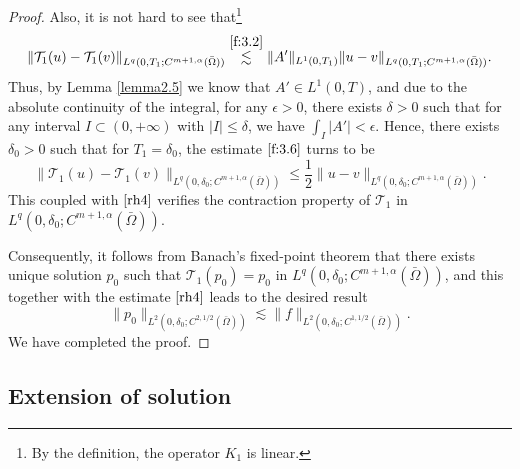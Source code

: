 \documentclass[13pt,CJK]{article}
\theoremstyle{plain}                       %
\theoremstyle{remark}
\numberwithin{equation}{section}
\begin{document}
\begin{proof}
Also, it is not hard to see that\footnote{By the definition,
the operator
$K_1$ is linear.}
\begin{equation}\label{f:3.6}
 \|\mathcal{T}_1(u)-\mathcal{T}_1(v)
 \|_{L^q(0,T_1;C^{m+1,\alpha}(\bar\Omega))}
 \overset{\eqref{f:3.2}}{\lesssim} \|A'\|_{L^1(0,T_1)}
\|u-v\|_{L^q(0,T_1;C^{m+1,\alpha}(\bar\Omega))}.
\end{equation}
Thus, by Lemma \ref{lemma2.5} we know that $A'\in L^1(0,T)$, and due to the absolute continuity of the integral, for any $\epsilon>0$, there exists $\delta>0$ such that for any interval $I\subset (0,+\infty)$ with $|I|\leq \delta$, we have $\int_{I}|A'|<\epsilon$.
Hence, there exists $\delta_0>0$ such that for $T_1=\delta_0$,
the estimate $\eqref{f:3.6}$ turns to be
\begin{equation*}
\|\mathcal{T}_1(u)-\mathcal{T}_1(v)
 \|_{L^q(0,\delta_0;C^{m+1,\alpha}(\bar\Omega))}
  \leq  \frac{1}{2}\|u-v\|_{L^q(0,\delta_0;C^{m+1,\alpha}(\bar\Omega))}.
\end{equation*}
This coupled with $\eqref{rh4}$ verifies the contraction property of $\mathcal{T}_1$
in $L^q(0,\delta_0;C^{m+1,\alpha}(\bar\Omega))$.


Consequently, it follows from Banach's fixed-point theorem that there exists unique solution $p_0$
such that $\mathcal{T}_1(p_0) = p_0$ in $L^q(0,\delta_0;C^{m+1,\alpha}(\bar\Omega))$, and this together with
the estimate $\eqref{rh4}$ leads to the desired result
\begin{equation*}
\|p_0\|_{L^2(0,\delta_0;C^{2,1/2}(\bar\Omega))}\lesssim
\|f\|_{L^2(0,\delta_0;C^{1,1/2}(\bar\Omega))}.
\end{equation*}
We have completed the proof.
\end{proof}


\subsection{\centering Extension of solution}
\end{document}
